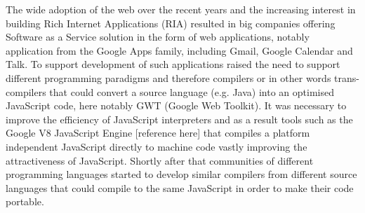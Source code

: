 The wide adoption of the web over the recent years and the increasing interest in building Rich Internet Applications (RIA) resulted in big companies offering Software as a Service solution in the form of web applications, notably application from the Google Apps family, including Gmail, Google Calendar and Talk. To support development of such applications raised the need to support different programming paradigms and therefore compilers or in other words trans-compilers that could convert a source language (e.g. Java) into an optimised JavaScript code, here notably GWT (Google Web Toolkit). It was necessary to improve the efficiency of JavaScript interpreters and as a result tools such as the Google V8 JavaScript Engine [reference here] that compiles a platform independent JavaScript directly to machine code vastly improving the attractiveness of JavaScript. Shortly after that communities of different programming languages started to develop similar compilers from different source languages that could compile to the same JavaScript in order to make their code portable.